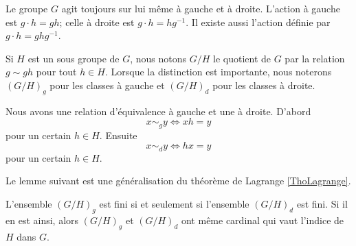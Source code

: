 Le groupe \( G\) agit toujours sur lui même à gauche et à droite. L'action à gauche est \( g\cdot h=gh\); celle à droite est \( g\cdot h=hg^{-1}\). Il existe aussi l'action  définie par \( g\cdot h=ghg^{-1}\).

Si \( H\) est un sous groupe de  \( G\), nous notons \( G/H\) le quotient de $G$ par la relation \( g\sim gh\) pour tout \( h\in H\). Lorsque la distinction est importante, nous noterons \( (G/H)_g\) pour les classes à gauche et \( (G/H)_d\) pour les classes à droite.

Nous avons une relation d'équivalence à gauche et une à droite. D'abord
\begin{equation}
    x\sim_g y\Leftrightarrow xh=y
\end{equation}
pour un certain \( h\in H\). Ensuite
\begin{equation}
    x\sim_d y\Leftrightarrow hx=y
\end{equation}
pour un certain \( h\in H\). 

Le lemme suivant est une généralisation du théorème de Lagrange \ref{ThoLagrange}.

\begin{lemma}
    L'ensemble \( (G/H)_g\) est fini si et seulement si l'ensemble \( (G/H)_d\) est fini. Si il en est ainsi, alors \( (G/H)_g\) et \( (G/H)_d\) ont même cardinal qui vaut l'indice de \( H\) dans \( G\).
\end{lemma}

